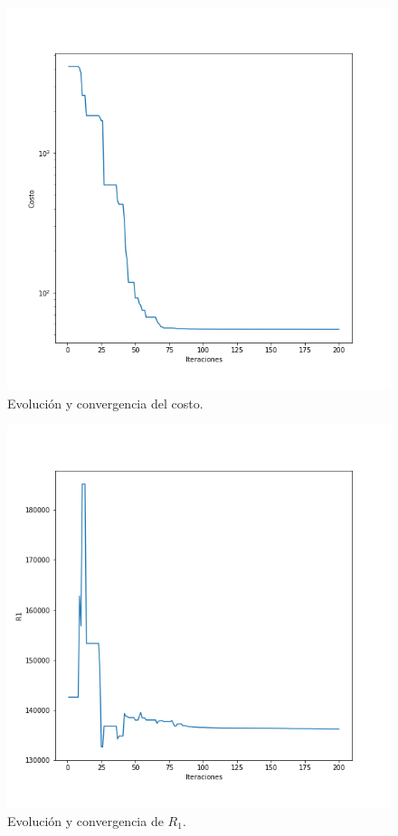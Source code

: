 \documentclass{llncs}
\begin{document}
	\begin{figure}[H]
		\includegraphics[width=\linewidth]{ContinuoLibre/Costo.png}
		\caption{Evolución y convergencia del costo.}
		\label{fig:CostoContinuoLibre}
	\end{figure}

	\begin{figure}[H]
		\includegraphics[width=\linewidth]{ContinuoLibre/R1.png}
		\caption{Evolución y convergencia de $R_1$.}
		\label{fig:R1ContinuoLibre}
	\end{figure}
\end{document}
